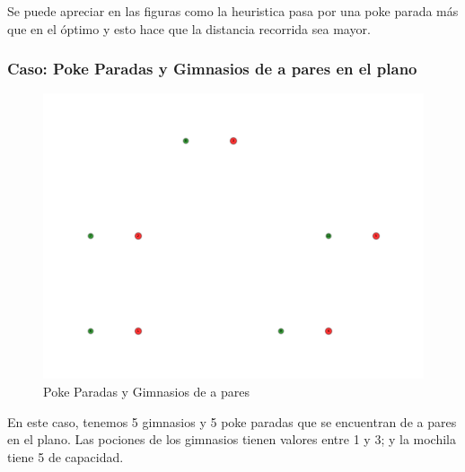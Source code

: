 Se puede apreciar en las figuras como la heuristica pasa por una poke parada más que en el óptimo y esto hace que la distancia recorrida sea mayor.


\subsubsection{Caso: Poke Paradas y Gimnasios de a pares en el plano}

\begin{figure}[H]
  \begin{center}
    \includegraphics[scale=0.4]{imagenes/test2.pdf}
    \caption{Poke Paradas y Gimnasios de a pares}
    \label{fig:ej2_caso2}
  \end{center}
\end{figure}

En este caso, tenemos 5 gimnasios y 5 poke paradas que se encuentran de a pares en el plano. Las pociones de los gimnasios tienen valores entre 1 y 3; y la mochila tiene 5 de capacidad.



